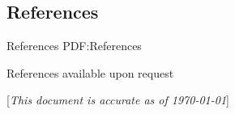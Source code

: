 \documentclass[a4paper,10pt,oneside]{article}
\newcommand{\CVNote}{This document is accurate as of {\today}}
\begin{document}
\begin{body}
\section
{References}
{References}
{PDF:References}



\par References available upon request





\end{body}


\begin{flushright}
\scriptsize%
[\textit{\CVNote}]%
\hspace{2.0mm}\null
\end{flushright}

\label{LastPage}~
\end{document}
